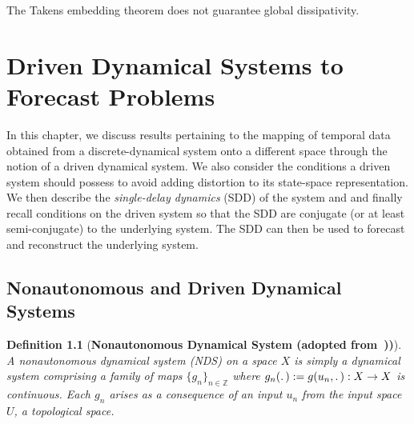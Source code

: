 \documentclass[a4paper,12pt,twoside]{report}
\newtheorem{Definition}{Definition}[]
\begin{document}
The Takens embedding theorem does not guarantee global dissipativity.




\chapter{Driven Dynamical Systems to Forecast Problems}\label{ch4}

In this chapter, we discuss results pertaining to the mapping of temporal data obtained from a discrete-dynamical system onto a different space through the notion of a driven dynamical system. 
We also consider the conditions a driven system should possess to avoid adding distortion to its state-space representation. We then describe the \emph{single-delay dynamics} (SDD) of the system and and finally recall conditions on the driven system so that the SDD are conjugate (or at least semi-conjugate) to the underlying system. 
The SDD can then be used to forecast and reconstruct the underlying system. 

\section{Nonautonomous and Driven Dynamical Systems}

\begin{Definition}
  [\bf Nonautonomous Dynamical System (adopted from~\cite{Manju_ESP}))] \label{Dfn_NDS}\rm
  A nonautonomous dynamical system (NDS) on a space $X$ is simply a dynamical system comprising a family of maps $\{g_n\}_{n \in \mathbb{Z}}$ where $g_n(\ldotp):=g(u_n,\ldotp):X\to{X}$ is continuous. Each $g_n$ arises as a consequence of an input $u_n$ from the input space $U$, a topological space. 
\end{Definition}
\end{document}
